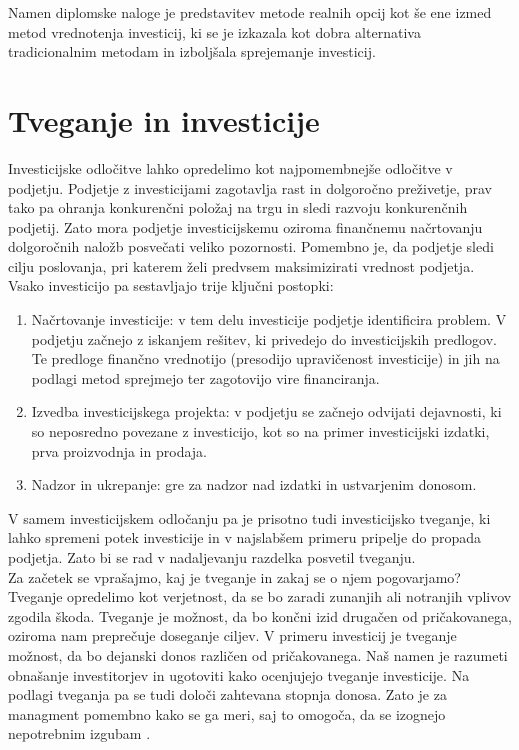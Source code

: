 \documentclass[12pt, a4paper]{amsart}
\theoremstyle{definition} %
\theoremstyle{plain} %
\begin{document}
Namen diplomske naloge je predstavitev metode realnih opcij kot še ene izmed metod vrednotenja investicij, ki se je izkazala kot dobra alternativa tradicionalnim metodam in izboljšala sprejemanje investicij. \\

\pagebreak

\section {Tveganje in investicije}
Investicijske odločitve lahko opredelimo kot najpomembnejše odločitve v podjetju. Podjetje z investicijami zagotavlja rast in dolgoročno preživetje, prav tako pa ohranja konkurenčni položaj na trgu in  sledi razvoju konkurenčnih podjetij. Zato mora podjetje investicijskemu oziroma finančnemu načrtovanju dolgoročnih naložb posvečati veliko pozornosti. Pomembno je, da podjetje sledi cilju poslovanja, pri katerem želi predvsem maksimizirati vrednost podjetja. Vsako investicijo pa sestavljajo trije ključni postopki:
\begin{enumerate}
\item{Načrtovanje investicije}: v tem delu investicije podjetje identificira problem. V podjetju začnejo z iskanjem rešitev, ki privedejo do investicijskih predlogov. Te predloge finančno vrednotijo (presodijo upravičenost investicije) in jih na podlagi metod sprejmejo ter zagotovijo vire financiranja.
\item{Izvedba investicijskega projekta}: v podjetju se začnejo odvijati dejavnosti, ki so neposredno povezane z investicijo, kot so na primer investicijski izdatki, prva proizvodnja in prodaja.
\item{Nadzor in ukrepanje}: gre za nadzor nad izdatki in ustvarjenim donosom.
\end{enumerate}

V samem investicijskem odločanju pa je prisotno tudi investicijsko tveganje, ki lahko spremeni potek investicije in v najslabšem primeru pripelje do propada podjetja. Zato bi se rad v nadaljevanju razdelka posvetil tveganju.\\

Za začetek se vprašajmo, kaj je tveganje in zakaj se o njem pogovarjamo?\\
Tveganje opredelimo kot verjetnost, da se bo zaradi zunanjih ali notranjih vplivov zgodila škoda. Tveganje je možnost, da bo končni izid drugačen od pričakovanega, oziroma nam preprečuje doseganje ciljev. V primeru investicij je tveganje možnost, da bo dejanski donos različen od pričakovanega. Naš namen je razumeti obnašanje investitorjev in ugotoviti kako ocenjujejo tveganje investicije. Na podlagi tveganja pa se tudi določi zahtevana stopnja donosa. Zato je za managment pomembno kako se ga meri, saj to omogoča, da se izognejo nepotrebnim izgubam \cite{investopedia}. \\
\end{document}
